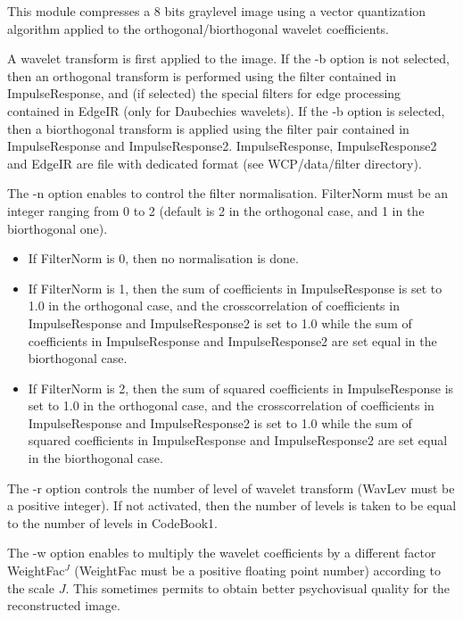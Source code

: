 This module compresses a 8 bits graylevel image using a vector quantization 
algorithm applied to the orthogonal/biorthogonal wavelet coefficients. 

A wavelet transform is first applied to the image. If the -b option 
is not selected, then an orthogonal transform is performed using the 
filter contained in ImpulseResponse, and (if selected) the special 
filters for edge processing contained in EdgeIR (only for Daubechies 
wavelets). If the -b option is selected, then a biorthogonal transform 
is applied using the filter pair contained in ImpulseResponse 
and ImpulseResponse2. ImpulseResponse, ImpulseResponse2 and EdgeIR 
are file with dedicated format (see WCP/data/filter directory). 

The -n option enables to control the filter normalisation. FilterNorm 
must be an integer ranging from 0 to 2 (default is 2 in the orthogonal case, 
and 1 in the biorthogonal one). 
\begin{itemize} 
\item 
If FilterNorm is 0, then no normalisation is done.
\item 
If FilterNorm is 1, then the sum of coefficients in ImpulseResponse 
is set to 1.0 in the orthogonal case, and the crosscorrelation of 
coefficients in ImpulseResponse and ImpulseResponse2 is set to 1.0 
while the sum of coefficients in ImpulseResponse and ImpulseResponse2 
are set equal in the biorthogonal case. 
\item
If FilterNorm is 2, then the sum of squared coefficients in ImpulseResponse 
is set to 1.0 in the orthogonal case, and the crosscorrelation of 
coefficients in ImpulseResponse and ImpulseResponse2 is set to 1.0 
while the sum of squared coefficients in ImpulseResponse and ImpulseResponse2 
are set equal in the biorthogonal case. 
\end{itemize}

The -r option controls the number of level of wavelet transform (WavLev 
must be a positive integer). If not activated, then the number of levels 
is taken to be equal to the number of levels in CodeBook1. 

The -w option enables to multiply the wavelet coefficients by a different 
factor WeightFac$^J$ (WeightFac must be a positive floating point number) 
according to the scale $J$. This sometimes permits to obtain better 
psychovisual quality for the reconstructed image. 

